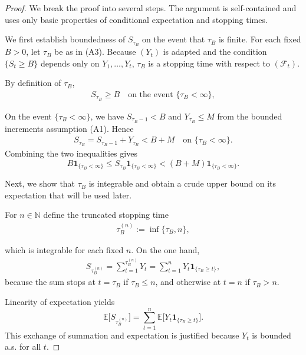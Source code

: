 \begin{proof}
We break the proof into several steps. The argument is self-contained and uses only basic properties of conditional expectation and stopping times.

\medskip
\noindent We first establish boundedness of $S_{\tau_B}$ on the event that $\tau_B$ is finite. For each fixed $B>0$, let $\tau_B$ be as in (A3). Because $(Y_t)$ is adapted and the condition $\{S_t\geq B\}$ depends only on $Y_1,\dots,Y_t$, $\tau_B$ is a stopping time with respect to $(\mathcal{F}_t)$.

By definition of $\tau_B$,
\begin{align*}
  S_{\tau_B} \geq B
  \quad\text{on the event } \{\tau_B<\infty\},
\end{align*}

On the event $\{\tau_B<\infty\}$, we have $S_{\tau_B-1} < B$
and $Y_{\tau_B}\leq M$ from the bounded increments assumption (A1). Hence
\begin{align*}
  S_{\tau_B} = S_{\tau_B-1} + Y_{\tau_B}
  < B + M
  \quad\text{on } \{\tau_B<\infty\}.
\end{align*}
Combining the two inequalities gives
\begin{equation}
  B \mathbf{1}_{\{\tau_B<\infty\}}
  \leq
  S_{\tau_B}\mathbf{1}_{\{\tau_B<\infty\}}
  <
  (B+M)\mathbf{1}_{\{\tau_B<\infty\}}.
  \label{eq:overshoot-inequality}
\end{equation}

\medskip


Next, we show that $\tau_B$ is integrable and obtain a crude upper bound on its expectation that will be used later.

For $n\in\mathbb{N}$ define the truncated stopping time
\begin{align*}
  \tau_B^{(n)} := \inf\{\tau_B, n\},
\end{align*}

which is integrable for each fixed $n$. On the one hand,
\begin{align*}
  S_{\tau_B^{(n)}}
  =
  \sum_{t=1}^{\tau_B^{(n)}} Y_t
  = \sum_{t=1}^n Y_t \mathbf{1}_{\{\tau_B\geq t\}},
\end{align*}
because the sum stops at $t=\tau_B$ if $\tau_B\leq n$, and otherwise at $t=n$ if $\tau_B>n$. 

Linearity of expectation yields
\begin{equation}
  \mathbb{E}\bigl[S_{\tau_B^{(n)}}\bigr]
  =
  \sum_{t=1}^n \mathbb{E}\bigl[Y_t \mathbf{1}_{\{\tau_B\geq t\}}\bigr].
  \label{eq:Es-tau-n-expansion}
\end{equation}
This exchange of summation and expectation is justified because $Y_t$ is bounded a.s. for all $t$.


\end{proof}
